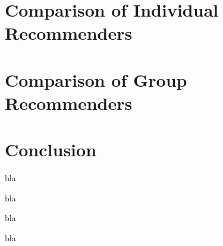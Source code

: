 \section{Comparison of Individual Recommenders}

\section{Comparison of Group Recommenders}


\section{Conclusion}

bla

bla

bla

bla